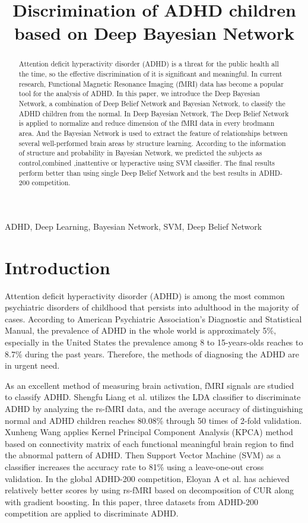 \documentclass{article}
\title{Discrimination of ADHD children based on Deep Bayesian Network}
\begin{document}
%
\maketitle
%
\begin{abstract}
Attention deficit hyperactivity disorder (ADHD) is a threat for the public health all the time, so the effective discrimination of it is significant and meaningful. In current research, Functional Magnetic Resonance Imaging (fMRI) data has become a popular tool for the analysis of ADHD. In this paper, we introduce the Deep Bayesian Network, a combination of Deep Belief Network and Bayesian Network, to classify the ADHD children from the normal. In Deep Bayesian Network, The Deep Belief Network is applied to  normalize and reduce dimension of the fMRI data in every brodmann area. And the Bayesian Network is used to extract the feature of relationships between several well-performed brain areas by structure learning. According to the information of structure and probability in Bayesian Network, we predicted the subjects as control,combined ,inattentive or hyperactive using SVM classifier. The final results perform better than using single Deep Belief Network and the best results in ADHD-200 competition. 

\end{abstract}
%
\begin{keywords}
ADHD, Deep Learning, Bayesian Network, SVM, Deep Belief Network
\end{keywords}
%
\section{Introduction}
\label{sec:intro}

Attention deficit hyperactivity disorder (ADHD) is among the most common psychiatric disorders of childhood that persists into adulthood in the majority of cases\cite{1}. According to American Psychiatric Association’s Diagnostic and Statistical Manual, the prevalence of ADHD in the whole world is approximately 5\%, especially in the United States the prevalence among 8 to 15-years-olds reaches to 8.7\% during the past years. Therefore, the methods of diagnosing the ADHD are in urgent need.
 
 
 
As an excellent method of measuring brain activation, fMRI
signals are studied to classify ADHD. Shengfu Liang et al.\cite{3} utilizes the LDA classifier to discriminate ADHD by analyzing the rs-fMRI data, and the average accuracy of distinguishing normal and ADHD children reaches 80.08\% through 50 times of 2-fold validation. Xunheng Wang\cite{4} applies Kernel Principal Component Analysis (KPCA) method based on connectivity matrix of each functional meaningful brain region to find the abnormal pattern of ADHD. Then Support Vector Machine (SVM) as a classifier increases the accuracy rate to 81\% using a leave-one-out cross validation. In the global ADHD-200 competition, Eloyan A et al.\cite{6} has achieved relatively better scores by using rs-fMRI based on decomposition of CUR along with gradient boosting. In this paper, three datasets from ADHD-200 competition are applied to discriminate ADHD.
\end{document}
